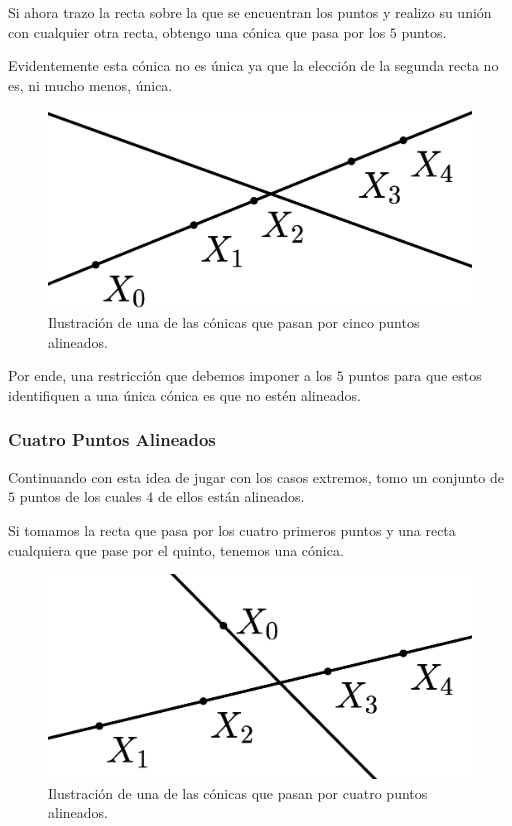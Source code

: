 	Si ahora trazo la recta sobre la que se encuentran los puntos y realizo su unión con cualquier otra recta, obtengo una cónica que pasa por los $5$ puntos.
	
	Evidentemente esta cónica no es única ya que la elección de la segunda recta no es, ni mucho menos, única.
	
	\begin{figure}[h]
		\centering
		\includegraphics[scale=.15]{Graficos/alineados5.eps}
		\caption{Ilustración de una de las cónicas que pasan por cinco puntos alineados.}
		\label{C8_img_alineados5}
	\end{figure}
	
	Por ende, una restricción que debemos imponer a los $5$ puntos para que estos identifiquen a una única cónica es que no estén alineados.
\subsubsection{Cuatro Puntos Alineados}
	Continuando con esta idea de jugar con los casos extremos, tomo un conjunto de $5$ puntos de los cuales $4$ de ellos están alineados.
	
	Si tomamos la recta que pasa por los cuatro primeros puntos y una recta cualquiera que pase por el quinto, tenemos una cónica.
	
	\begin{figure}[h]
		\centering
		\includegraphics[scale=.15]{Graficos/alineados4.eps}
		\caption{Ilustración de una de las cónicas que pasan por cuatro puntos alineados.}
		\label{C8_img_alineados4}
	\end{figure}
	
